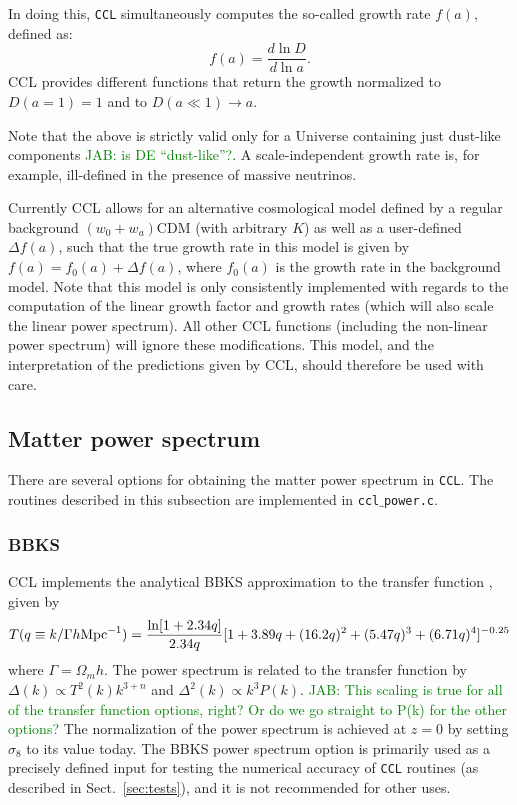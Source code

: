 \documentclass[\docopts]{\docclass}
\newcommand{\jab}[1]{\textcolor{green}{JAB: #1}}
\begin{document}
In doing this, {\tt CCL} simultaneously computes the so-called growth rate $f(a)$, defined as:
\begin{equation}
  f(a)=\frac{d\ln D}{d\ln a}.
\end{equation}
CCL provides different functions that return the growth normalized to $D(a=1)=1$ and to $D(a\ll1)\rightarrow a$.

Note that the above is strictly valid only for a Universe containing just dust-like components \jab{is DE ``dust-like''?}. A scale-independent growth rate is, for example, ill-defined in the presence of massive neutrinos.

Currently CCL allows for an alternative cosmological model defined by a regular background $(w_0+w_a)$CDM (with arbitrary $K$) as well as a user-defined $\Delta f(a)$, such that the true growth rate in this model is given by $f(a)=f_0(a)+\Delta f(a)$, where $f_0(a)$ is the growth rate in the background model. Note that this model is only consistently implemented with regards to the computation of the linear growth factor and growth rates (which will also scale the linear power spectrum). All other CCL functions (including the non-linear power spectrum) will ignore these modifications. This model, and the interpretation of the predictions given by CCL, should therefore be used with care.

\subsection{Matter power spectrum}
\label{sec:power}

There are several options for obtaining the matter power spectrum in {\tt CCL}.
The routines described in this subsection are implemented in {\tt ccl$\_$power.c}.

\subsubsection{BBKS}
CCL implements the analytical BBKS approximation to the transfer function \citep{BBKS}, given by
\begin{equation}
T(q\equiv k/\Gamma h {\rm Mpc}^{-1}) = \frac{\ln[1+2.34q]}{2.34q}[1+3.89q+(16.2q)^2+(5.47q)^3+(6.71q)^4]^{-0.25}
\end{equation}
where $\Gamma = \Omega_m h$.
The power spectrum is related to the transfer function by $\Delta(k)\propto T^2(k)k^{3+n}$ and $\Delta^2(k)\propto k^3P(k)$. \jab{This scaling is true for all of the transfer function options, right? Or do we go straight to P(k) for the other options?} The normalization of the power spectrum is achieved at $z=0$ by setting $\sigma_8$ to its value today.
The BBKS power spectrum option is primarily used as a precisely defined input for testing the numerical accuracy of {\tt CCL} routines (as described in Sect.~\ref{sec:tests}), and it is not recommended for other uses.
\end{document}
